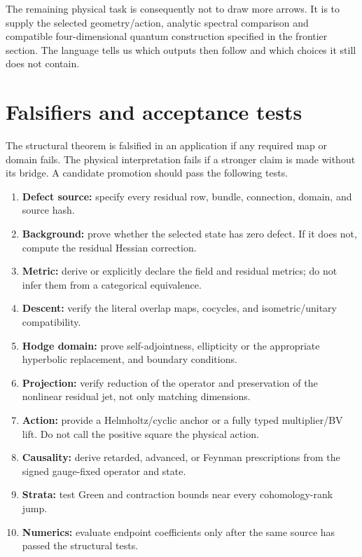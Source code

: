 \documentclass[11pt,a4paper]{article}
\begin{document}
The remaining physical task is consequently not to draw more arrows.
It is to supply the selected geometry/action, analytic spectral
comparison and compatible four-dimensional quantum construction
specified in the frontier section. The language tells us which
outputs then follow and which choices it still does not contain.

\section{Falsifiers and acceptance tests}

The structural theorem is falsified in an application if any required map
or domain fails.  The physical interpretation fails if a stronger claim is
made without its bridge.  A candidate promotion should pass the following
tests.
\begin{enumerate}
\item \textbf{Defect source:} specify every residual row, bundle, connection,
domain, and source hash.
\item \textbf{Background:} prove whether the selected state has zero defect.
If it does not, compute the residual Hessian correction.
\item \textbf{Metric:} derive or explicitly declare the field and residual
metrics; do not infer them from a categorical equivalence.
\item \textbf{Descent:} verify the literal overlap maps, cocycles, and
isometric/unitary compatibility.
\item \textbf{Hodge domain:} prove self-adjointness, ellipticity or the
appropriate hyperbolic replacement, and boundary conditions.
\item \textbf{Projection:} verify reduction of the operator and preservation
of the nonlinear residual jet, not only matching dimensions.
\item \textbf{Action:} provide a Helmholtz/cyclic anchor or a fully typed
multiplier/BV lift.  Do not call the positive square the physical action.
\item \textbf{Causality:} derive retarded, advanced, or Feynman prescriptions
from the signed gauge-fixed operator and state.
\item \textbf{Strata:} test Green and contraction bounds near every
cohomology-rank jump.
\item \textbf{Numerics:} evaluate endpoint coefficients only after the same
source has passed the structural tests.
\end{enumerate}
\end{document}
